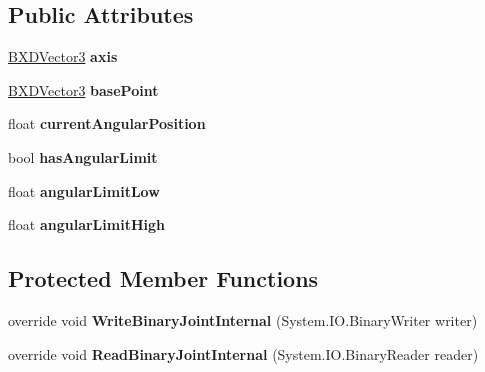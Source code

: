 \subsection*{Public Attributes}
\begin{DoxyCompactItemize}
\item 
\mbox{\label{class_rotational_joint___base_a563e367d610c700e84287c4e1e742184}} 
\hyperlink{class_b_x_d_vector3}{B\+X\+D\+Vector3} {\bfseries axis}
\item 
\mbox{\label{class_rotational_joint___base_ad9e90a18bfc6ead93400082a6be881d1}} 
\hyperlink{class_b_x_d_vector3}{B\+X\+D\+Vector3} {\bfseries base\+Point}
\item 
\mbox{\label{class_rotational_joint___base_a3100eacfde28fa7d60647a92f9918800}} 
float {\bfseries current\+Angular\+Position}
\item 
\mbox{\label{class_rotational_joint___base_a27e6baae357d6fa69fcadb4e0598198e}} 
bool {\bfseries has\+Angular\+Limit}
\item 
\mbox{\label{class_rotational_joint___base_a34bde1f9b9fe6712735c0b2a411d86f8}} 
float {\bfseries angular\+Limit\+Low}
\item 
\mbox{\label{class_rotational_joint___base_acf2a487241c8789bcd95880878056530}} 
float {\bfseries angular\+Limit\+High}
\end{DoxyCompactItemize}
\subsection*{Protected Member Functions}
\begin{DoxyCompactItemize}
\item 
\mbox{\label{class_rotational_joint___base_a4d92febe9d2e4091063414aebe56088c}} 
override void {\bfseries Write\+Binary\+Joint\+Internal} (System.\+I\+O.\+Binary\+Writer writer)
\item 
\mbox{\label{class_rotational_joint___base_ac40e374dafc390b533e69ca4803453cf}} 
override void {\bfseries Read\+Binary\+Joint\+Internal} (System.\+I\+O.\+Binary\+Reader reader)
\end{DoxyCompactItemize}
